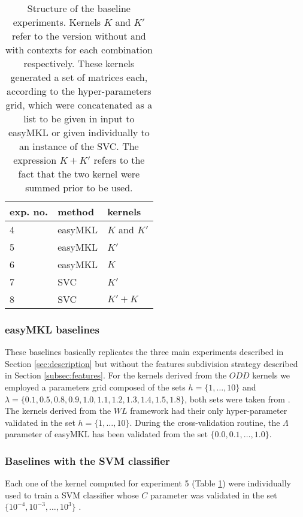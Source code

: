 \begin{table}[ht]
    \centering
    \begin{tabular}{|l|l|l|}
        \hline
        exp. no. & method & kernels \\
        \hline
        4 & easyMKL & $K$ and $K'$ \\
        \hline
        5 & easyMKL & $K'$ \\
        \hline
        6 & easyMKL & $K$ \\
        \hline
        7 & SVC & $K'$ \\
        \hline
        8 & SVC & $K'+K$ \\
        \hline
    \end{tabular}
    \caption{Structure of the baseline experiments. Kernels $K$ and $K'$ refer
    to the version without and with contexts for each combination respectively.
    These kernels generated a set of matrices each, according to the hyper-parameters
    grid, which were concatenated as a list to be given in input to easyMKL or
    given individually to an instance of the SVC. The expression $K + K'$ refers
    to the fact that the two kernel were summed prior to be used.}
    \label{table:baselines}
\end{table}

\subsubsection{easyMKL baselines}
These baselines basically replicates the three main experiments described in Section
\ref{sec:description} but without the features subdivision strategy described in
Section \ref{subsec:features}.
For the kernels derived from the $ODD$ kernels we employed a parameters grid composed
of the sets $h=\{1,\dots,10\}$ and $\lambda=\{0.1, 0.5, 0.8, 0.9, 1.0, 1.1, 1.2, 1.3, 1.4, 1.5, 1.8\}$,
both sets were taken from \cite{rtesselli}.
The kernels derived from the $WL$ framework had their only hyper-parameter validated
in the set $h=\{1,\dots,10\}$.
During the cross-validation routine, the $\Lambda$ parameter of easyMKL has been
validated from the set $\{0.0, 0.1,\dots,1.0\}$.

\subsubsection{Baselines with the SVM classifier}

Each one of the kernel computed for experiment 5 (Table \ref{table:baselines}) were
individually used to train a SVM classifier whose $C$ parameter was validated
in the set $\{10^{-4},10^{-3},\dots,10^3\}$ \cite{rtesselli}.


